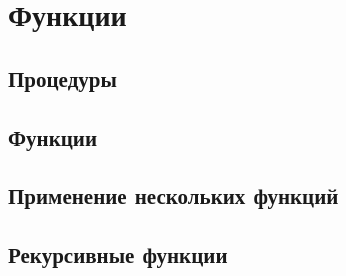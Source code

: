 \section{Функции}

\subsection{Процедуры}

\subsection{Функции}

\subsection{Применение нескольких функций}

\subsection{Рекурсивные функции}
